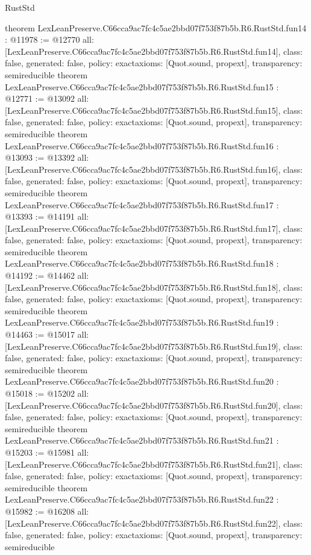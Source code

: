 \begin{lexlean}{RustStd}
\begin{coremodule}
{}
theorem LexLeanPreserve.C66cca9ac7fc4c5ae2bbd07f753f87b5b.R6.RustStd.fun14 : @11978 := @12770 {
  all: [LexLeanPreserve.C66cca9ac7fc4c5ae2bbd07f753f87b5b.R6.RustStd.fun14],
  class: false,
  generated: false,
  policy: exact{axioms: [Quot.sound, propext]},
  transparency: semireducible
}
theorem LexLeanPreserve.C66cca9ac7fc4c5ae2bbd07f753f87b5b.R6.RustStd.fun15 : @12771 := @13092 {
  all: [LexLeanPreserve.C66cca9ac7fc4c5ae2bbd07f753f87b5b.R6.RustStd.fun15],
  class: false,
  generated: false,
  policy: exact{axioms: [Quot.sound, propext]},
  transparency: semireducible
}
theorem LexLeanPreserve.C66cca9ac7fc4c5ae2bbd07f753f87b5b.R6.RustStd.fun16 : @13093 := @13392 {
  all: [LexLeanPreserve.C66cca9ac7fc4c5ae2bbd07f753f87b5b.R6.RustStd.fun16],
  class: false,
  generated: false,
  policy: exact{axioms: [Quot.sound, propext]},
  transparency: semireducible
}
theorem LexLeanPreserve.C66cca9ac7fc4c5ae2bbd07f753f87b5b.R6.RustStd.fun17 : @13393 := @14191 {
  all: [LexLeanPreserve.C66cca9ac7fc4c5ae2bbd07f753f87b5b.R6.RustStd.fun17],
  class: false,
  generated: false,
  policy: exact{axioms: [Quot.sound, propext]},
  transparency: semireducible
}
theorem LexLeanPreserve.C66cca9ac7fc4c5ae2bbd07f753f87b5b.R6.RustStd.fun18 : @14192 := @14462 {
  all: [LexLeanPreserve.C66cca9ac7fc4c5ae2bbd07f753f87b5b.R6.RustStd.fun18],
  class: false,
  generated: false,
  policy: exact{axioms: [Quot.sound, propext]},
  transparency: semireducible
}
theorem LexLeanPreserve.C66cca9ac7fc4c5ae2bbd07f753f87b5b.R6.RustStd.fun19 : @14463 := @15017 {
  all: [LexLeanPreserve.C66cca9ac7fc4c5ae2bbd07f753f87b5b.R6.RustStd.fun19],
  class: false,
  generated: false,
  policy: exact{axioms: [Quot.sound, propext]},
  transparency: semireducible
}
theorem LexLeanPreserve.C66cca9ac7fc4c5ae2bbd07f753f87b5b.R6.RustStd.fun20 : @15018 := @15202 {
  all: [LexLeanPreserve.C66cca9ac7fc4c5ae2bbd07f753f87b5b.R6.RustStd.fun20],
  class: false,
  generated: false,
  policy: exact{axioms: [Quot.sound, propext]},
  transparency: semireducible
}
theorem LexLeanPreserve.C66cca9ac7fc4c5ae2bbd07f753f87b5b.R6.RustStd.fun21 : @15203 := @15981 {
  all: [LexLeanPreserve.C66cca9ac7fc4c5ae2bbd07f753f87b5b.R6.RustStd.fun21],
  class: false,
  generated: false,
  policy: exact{axioms: [Quot.sound, propext]},
  transparency: semireducible
}
theorem LexLeanPreserve.C66cca9ac7fc4c5ae2bbd07f753f87b5b.R6.RustStd.fun22 : @15982 := @16208 {
  all: [LexLeanPreserve.C66cca9ac7fc4c5ae2bbd07f753f87b5b.R6.RustStd.fun22],
  class: false,
  generated: false,
  policy: exact{axioms: [Quot.sound, propext]},
  transparency: semireducible
}
\end{coremodule}
\end{lexlean}
